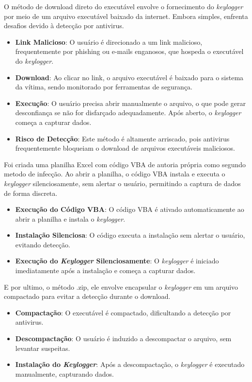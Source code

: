 \documentclass[12pt]{article}
\begin{document}
O método de download direto do executável envolve o fornecimento do \textit{keylogger} por meio de um arquivo executável baixado da internet. Embora simples, enfrenta desafios devido à detecção por antivirus.

\begin{itemize}
    \item \textbf{Link Malicioso}: O usuário é direcionado a um link malicioso, frequentemente por phishing ou e-mails enganosos, que hospeda o executável do \textit{keylogger}.
    \item \textbf{Download}: Ao clicar no link, o arquivo executável é baixado para o sistema da vítima, sendo monitorado por ferramentas de segurança.
    \item \textbf{Execução}: O usuário precisa abrir manualmente o arquivo, o que pode gerar desconfiança se não for disfarçado adequadamente. Após aberto, o \textit{keylogger} começa a capturar dados.
    \item \textbf{Risco de Detecção}: Este método é altamente arriscado, pois antivirus frequentemente bloqueiam o download de arquivos executáveis maliciosos.
\end{itemize}


Foi criada uma planilha Excel com código VBA de autoria própria como segundo metodo de infecção. 
Ao abrir a planilha, o código VBA instala e executa o \textit{keylogger} silenciosamente, 
sem alertar o usuário, permitindo a captura de dados de forma discreta.

\begin{itemize}
    \item \textbf{Execução do Código VBA}: O código VBA é ativado automaticamente ao abrir a planilha e instala o \textit{keylogger}.
    \item \textbf{Instalação Silenciosa}: O código executa a instalação sem alertar o usuário, evitando detecção.
    \item \textbf{Execução do \textit{Keylogger} Silenciosamente}: O \textit{keylogger} é iniciado imediatamente após a instalação e começa a capturar dados.
\end{itemize}

E por ultimo, o método .zip, ele envolve encapsular o \textit{keylogger} em um arquivo compactado para evitar a detecção durante o download.

\begin{itemize}
    \item \textbf{Compactação}: O executável é compactado, dificultando a detecção por antivirus.
    \item \textbf{Descompactação}: O usuário é induzido a descompactar o arquivo, sem levantar suspeitas.
    \item \textbf{Instalação do \textit{Keylogger}}: Após a descompactação, o \textit{keylogger} é executado manualmente, capturando dados.
\end{itemize}
\end{document}
